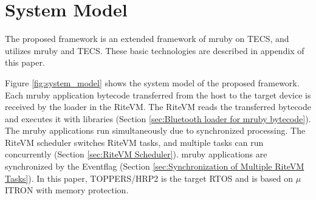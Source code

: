 \documentclass[conference]{IEEEtran/IEEEtran/IEEEtran}
\begin{document}
%
%
%
%
%

\section{System Model}
\label{sec:System Model}
The proposed framework is an extended framework of mruby on TECS, and utilizes mruby and TECS.
These basic technologies are described in appendix of this paper.

Figure \ref{fig:system_model} shows the system model of the proposed framework.
Each mruby application bytecode transferred from the host to the target device is received by the loader in the RiteVM.
The RiteVM reads the transferred bytecode and executes it with libraries (Section \ref{sec:Bluetooth loader for mruby bytecode}).
The mruby applications run simultaneously due to synchronized processing.
The RiteVM scheduler switches RiteVM tasks, and multiple tasks can run concurrently (Section \ref{sec:RiteVM Scheduler}).
mruby applications are synchronized by the Eventflag (Section \ref{sec:Synchronization of Multiple RiteVM Tasks}).
In this paper, TOPPERS/HRP2 \cite{par:hr-tecs} is the target RTOS and is based on $\mu$ITRON \cite{par:microITRON} with memory protection.
\end{document}
